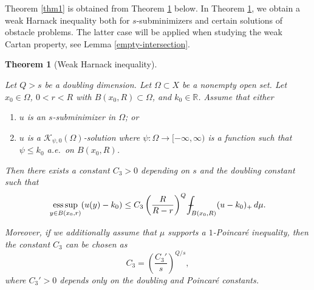 \documentclass[11pt,leqno]{amsart}
\def\Xint#1{\mathchoice
	{\XXint\displaystyle\textstyle{#1}}
	{\XXint\textstyle\scriptstyle{#1}}
	{\XXint\scriptstyle\scriptscriptstyle{#1}}
	{\XXint\scriptscriptstyle\scriptscriptstyle{#1}}
	\!\int}
\def\XXint#1#2#3{{\setbox0=\hbox{$#1{#2#3}{\int}$ }
		\vcenter{\hbox{$#2#3$ }}\kern-.6\wd0}}
\def\dashint{\Xint-}
\newtheorem{theorem}{Theorem}[section]
\numberwithin{equation}{section}
\theoremstyle{definition}
\DeclareMathOperator*{\esssup}{ess\,sup}
\begin{document}
	Theorem \ref{thm1} is obtained from Theorem \ref{thm1-20nov} below.
	In Theorem \ref{thm1-20nov}, we obtain a weak Harnack inequality both for 
	$s$-subminimizers and certain solutions of obstacle problems.
	The latter case will be applied when studying the
	weak Cartan property, see Lemma \ref{empty-intersection}.
	\begin{theorem}
		[Weak Harnack inequality]
		\label{thm1-20nov}
		
		
		Let $Q>s$ be a doubling dimension.
		Let $\Omega\subset X$ be a nonempty open set.
		Let  $x_0\in\Omega$, $0<r<R$ with $B(x_0,R)\subset\Omega$, and $k_0\in\mathbb R$.
		Assume that either
		\begin{enumerate}
			\item \label{Thm1.1-item-a}
			$u$ is an $s$-subminimizer 
			{in $\Omega$}; or
			\item \label{Thm1.1-item-b}
			$u$ is a $\mathcal{K}_{\psi,0}(\Omega)$-solution  where $\psi:\Omega\to[-\infty,\infty)$ is a function such that  $\psi\leq k_0$ a.e.\ on $B(x_0,R)$.
		\end{enumerate} 
		Then there exists a constant $C_3>0$  depending on $s$ and the doubling constant such that 
		\[
		\esssup_{y\in B(x_0,r)}(u(y)-k_0)\leq C_3 \left( \frac{R}{R-r}\right)^Q \dashint_{B(x_0,R)} (u-k_0)_+\,d\mu.
		\]
		
		Moreover, if we additionally assume that $\mu$ supports a $1$-Poincar\'e inequality, then the constant $C_3$ can be chosen as
		\[
		C_3 = \left(\frac{C_3'}{s}\right)^{Q/s},
		\]
		where $C_3' >0$ depends only on the doubling and Poincar\'e constants.
		
	\end{theorem}
	
\end{document}

